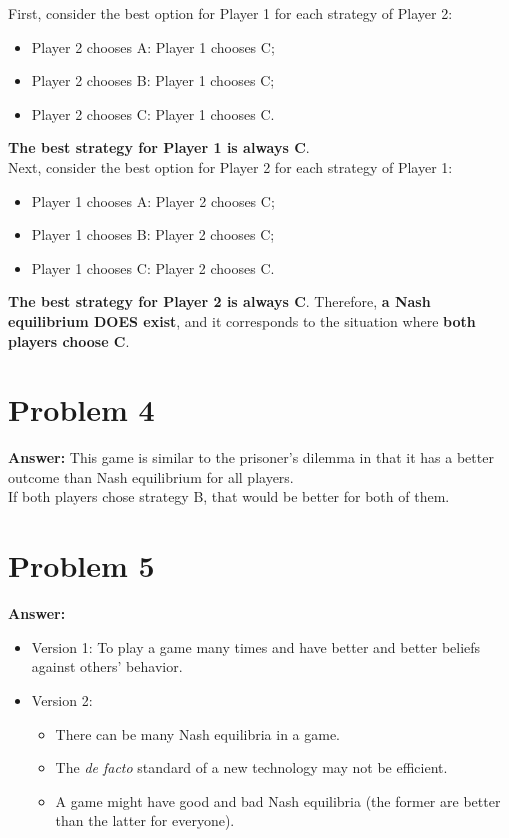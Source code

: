 \documentclass[11pt]{article}
\begin{document}
First, consider the best option for Player 1 for each strategy of Player 2:
\begin{itemize}
\item Player 2 chooses A: Player 1 chooses C;
\item Player 2 chooses B: Player 1 chooses C;
\item Player 2 chooses C: Player 1 chooses C.
\end{itemize}
\textbf{The best strategy for Player 1 is always C}.\\
Next, consider the best option for Player 2 for each strategy of Player 1:
\begin{itemize}
\item Player 1 chooses A: Player 2 chooses C;
\item Player 1 chooses B: Player 2 chooses C;
\item Player 1 chooses C: Player 2 chooses C.
\end{itemize}
\textbf{The best strategy for Player 2 is always C}. Therefore, \textbf{a Nash equilibrium DOES
exist}, and it corresponds to the situation where \textbf{both players choose C}.
\section*{Problem 4}
\label{sec:org987fc38}

\textbf{Answer:} This game is similar to the prisoner's dilemma in that it has a better
outcome than Nash equilibrium for all players.\\

If both players chose strategy B, that would be better for both of them.
\section*{Problem 5}
\label{sec:orgf9acbf8}

\textbf{Answer:}
\begin{itemize}
\item Version 1: To play a game many times and have better and better beliefs
against others' behavior.
\item Version 2:
\begin{itemize}
\item There can be many Nash equilibria in a game.
\item The \emph{de facto} standard of a new technology may not be efficient.
\item A game might have good and bad Nash equilibria (the former are better than
the latter for everyone).
\end{itemize}
\end{itemize}
\end{document}
